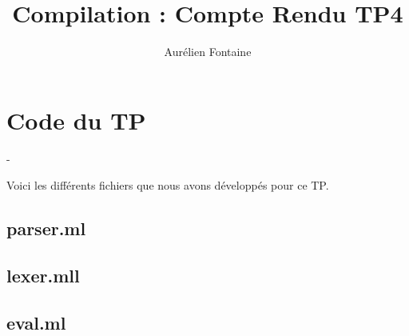 \documentclass{rapport}
\author{Aurélien Fontaine}
\title{Compilation : Compte Rendu TP4}
\begin{document}
    \maketitle

    \chapter{Code du TP}-

    Voici les différents fichiers que nous avons développés pour ce TP.

    \section{parser.ml}
    

    \section{lexer.mll}
    

    \section{eval.ml}
    
\end{document}
